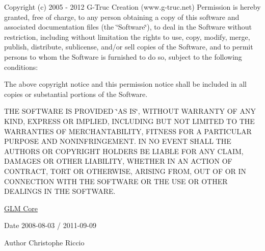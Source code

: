 \-Copyright (c) 2005 -\/ 2012 \-G-\/\-Truc \-Creation (www.\-g-\/truc.\-net) \-Permission is hereby granted, free of charge, to any person obtaining a copy of this software and associated documentation files (the \char`\"{}\-Software\char`\"{}), to deal in the \-Software without restriction, including without limitation the rights to use, copy, modify, merge, publish, distribute, sublicense, and/or sell copies of the \-Software, and to permit persons to whom the \-Software is furnished to do so, subject to the following conditions\-:

\-The above copyright notice and this permission notice shall be included in all copies or substantial portions of the \-Software.

\-T\-H\-E \-S\-O\-F\-T\-W\-A\-R\-E \-I\-S \-P\-R\-O\-V\-I\-D\-E\-D \char`\"{}\-A\-S I\-S\char`\"{}, \-W\-I\-T\-H\-O\-U\-T \-W\-A\-R\-R\-A\-N\-T\-Y \-O\-F \-A\-N\-Y \-K\-I\-N\-D, \-E\-X\-P\-R\-E\-S\-S \-O\-R \-I\-M\-P\-L\-I\-E\-D, \-I\-N\-C\-L\-U\-D\-I\-N\-G \-B\-U\-T \-N\-O\-T \-L\-I\-M\-I\-T\-E\-D \-T\-O \-T\-H\-E \-W\-A\-R\-R\-A\-N\-T\-I\-E\-S \-O\-F \-M\-E\-R\-C\-H\-A\-N\-T\-A\-B\-I\-L\-I\-T\-Y, \-F\-I\-T\-N\-E\-S\-S \-F\-O\-R \-A \-P\-A\-R\-T\-I\-C\-U\-L\-A\-R \-P\-U\-R\-P\-O\-S\-E \-A\-N\-D \-N\-O\-N\-I\-N\-F\-R\-I\-N\-G\-E\-M\-E\-N\-T. \-I\-N \-N\-O \-E\-V\-E\-N\-T \-S\-H\-A\-L\-L \-T\-H\-E \-A\-U\-T\-H\-O\-R\-S \-O\-R \-C\-O\-P\-Y\-R\-I\-G\-H\-T \-H\-O\-L\-D\-E\-R\-S \-B\-E \-L\-I\-A\-B\-L\-E \-F\-O\-R \-A\-N\-Y \-C\-L\-A\-I\-M, \-D\-A\-M\-A\-G\-E\-S \-O\-R \-O\-T\-H\-E\-R \-L\-I\-A\-B\-I\-L\-I\-T\-Y, \-W\-H\-E\-T\-H\-E\-R \-I\-N \-A\-N \-A\-C\-T\-I\-O\-N \-O\-F \-C\-O\-N\-T\-R\-A\-C\-T, \-T\-O\-R\-T \-O\-R \-O\-T\-H\-E\-R\-W\-I\-S\-E, \-A\-R\-I\-S\-I\-N\-G \-F\-R\-O\-M, \-O\-U\-T \-O\-F \-O\-R \-I\-N \-C\-O\-N\-N\-E\-C\-T\-I\-O\-N \-W\-I\-T\-H \-T\-H\-E \-S\-O\-F\-T\-W\-A\-R\-E \-O\-R \-T\-H\-E \-U\-S\-E \-O\-R \-O\-T\-H\-E\-R \-D\-E\-A\-L\-I\-N\-G\-S \-I\-N \-T\-H\-E \-S\-O\-F\-T\-W\-A\-R\-E.

\hyperlink{group__core}{\-G\-L\-M \-Core}

\begin{DoxyDate}{\-Date}
2008-\/08-\/03 / 2011-\/09-\/09 
\end{DoxyDate}
\begin{DoxyAuthor}{\-Author}
\-Christophe \-Riccio 
\end{DoxyAuthor}

